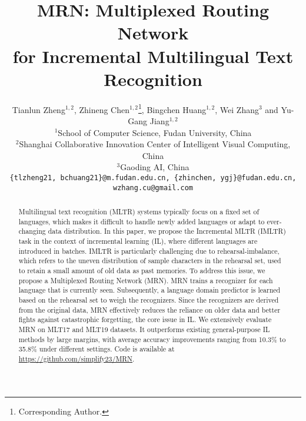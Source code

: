 \documentclass[10pt,twocolumn,letterpaper]{article}
\begin{document}
\title{MRN: Multiplexed Routing Network \\for Incremental Multilingual Text Recognition}

\author{
Tianlun Zheng$^{1,2}$,  Zhineng Chen$^{1,2}$\thanks{Corresponding Author.},  Bingchen Huang$^{1,2}$,  Wei Zhang$^3$ and Yu-Gang Jiang$^{1,2}$\\
$^1$School of Computer Science, Fudan University, China\\
$^2$Shanghai Collaborative Innovation Center of Intelligent Visual Computing, China\\
$^3$Gaoding AI, China\\
{\tt\small\{tlzheng21, bchuang21\}@m.fudan.edu.cn,
\{zhinchen, ygj\}@fudan.edu.cn,
wzhang.cu@gmail.com}
}

\maketitle
\ificcvfinal\thispagestyle{empty}\fi


\maketitle

\begin{abstract}
Multilingual text recognition (MLTR) systems typically focus on a fixed set of languages, which makes it difficult to handle newly added languages or adapt to ever-changing data distribution. In this paper, we propose the Incremental MLTR (IMLTR) task in the context of incremental learning (IL), where different languages are introduced in batches. IMLTR is particularly challenging due to rehearsal-imbalance, which refers to the uneven distribution of sample characters in the rehearsal set, used to retain a small amount of old data as past memories. To address this issue, we propose a Multiplexed Routing Network (MRN). MRN trains a recognizer for each language that is currently seen. Subsequently, a language domain predictor is learned based on the rehearsal set to weigh the recognizers. Since the recognizers are derived from the original data, MRN effectively reduces the reliance on older data and better fights against catastrophic forgetting, the core issue in IL. We extensively evaluate MRN on MLT17 and MLT19 datasets. It outperforms existing general-purpose IL methods by large margins, with average accuracy improvements ranging from 10.3\% to 35.8\% under different settings. Code is available at \url{https://github.com/simplify23/MRN}.

\end{abstract}
\end{document}
